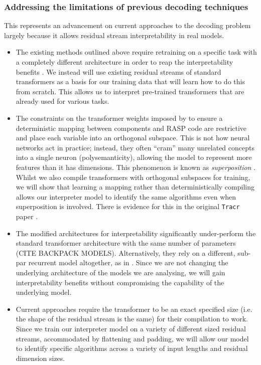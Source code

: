 \documentclass[11pt]{scrartcl}
\begin{document}
\subsubsection{Addressing the limitations of previous decoding techniques}
This represents an advancement on current approaches to the decoding problem largely because it allows residual stream interpretability in real models. 
\begin{itemize}
\item The existing methods outlined above require retraining on a specific task with a completely different architecture in order to reap the interpretability benefits \cite{friedman2024learning, michaud2024opening, tamkin2023codebook, liao2023generating}. \color{green}We instead will use existing residual streams of standard transformers as a basis for our training data that will learn how to do this from scratch. This allows us to interpret pre-trained transformers that are already used for various tasks. \color{black} 
\item The constraints on the transformer weights imposed by \textcite{friedman2024learning} to ensure a deterministic mapping between components and RASP code are restrictive and place each variable into an orthogonal subspace. This is not how neural networks act in practice; instead, they often ``cram'' many unrelated concepts into a single neuron (polysemanticity), allowing the model to represent more features than it has dimensions. This phenomenon is known as \textit{superposition} \cite{elhage2022toy}. \color{green} Whilst we also compile transformers with orthogonal subspaces for training, we will show that learning a mapping rather than deterministically compiling allows our interpreter model to identify the same algorithms even when superposition is involved. There is evidence for this in the original \texttt{Tracr} paper \cite{lindner2024tracr}. \color{black}
\item The modified architectures for interpretability significantly under-perform the standard transformer architecture with the same number of parameters \cite{friedman2024learning} (CITE BACKPACK MODELS). Alternatively, they rely on a different, sub-par recurrent model altogether, as in \cite{michaud2024opening}. \color{green} Since we are not changing the underlying architecture of the models we are analysing, we will gain interpretability benefits without compromising the capability of the underlying model. \color{black}
\item Current approaches require the transformer to be an exact specified size (i.e. the shape of the residual stream is the same) for their compilation to work. \color{green} Since we train our interpreter model on a variety of different sized residual streams, accommodated by flattening and padding, we will allow our model to identify specific algorithms across a variety of input lengths and residual dimension sizes.
\end{itemize}
\end{document}
